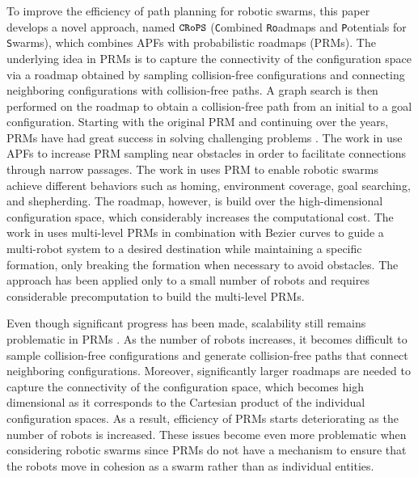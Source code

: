 \documentclass{llncs}
\newcommand{\Acronym}[1]{\ensuremath{{\small{\texttt{#1}}}}}
\newcommand{\Name}{\Acronym{CRoPS}}
\begin{document}
To improve the efficiency of path planning for robotic swarms, this
paper develops a novel approach, named $\Name$ (\texttt{C}ombined
\texttt{Ro}admaps and \texttt{P}otentials for \texttt{S}warms), which combines APFs
with probabilistic roadmaps (PRMs). The underlying idea in PRMs is to
capture the connectivity of the configuration space via a roadmap
obtained by sampling collision-free configurations and connecting
neighboring configurations with collision-free paths. A graph search
is then performed on the roadmap to obtain a collision-free path from
an initial to a goal configuration.  Starting with the original PRM
\cite{PRM} and continuing over the years, PRMs have had great success
in solving challenging problems
\cite{TogglePRM,UOBPRM,PlakuTRO05,HSUBridge,GaussianPRM,manocha12}.
The work in \cite{PRMapf1,PRMapf2} use APFs to increase PRM sampling near
obstacles in order to facilitate connections through narrow passages.
The work in \cite{LienSwarming,LienSwarmingRules,LienShepherding} uses
PRM to enable robotic swarms achieve different
behaviors such as homing, environment coverage, goal searching, and
shepherding. The roadmap, however, is build over the high-dimensional
configuration space, which considerably increases the computational
cost. The work in \cite{KostasSwarm} uses multi-level PRMs in
combination with Bezier curves to guide a multi-robot system to a
desired destination while maintaining a specific formation, only
breaking the formation when necessary to avoid obstacles. The approach
has been applied only to a small number of robots and requires
considerable precomputation to build the multi-level PRMs.


Even though significant progress has been made, scalability still
remains problematic in PRMs \cite{book:MP,book:LaValle}. As the number
of robots increases, it becomes difficult to sample collision-free
configurations and generate collision-free paths that connect
neighboring configurations. Moreover, significantly larger roadmaps
are needed to capture the connectivity of the configuration space,
which becomes high dimensional as it corresponds to the Cartesian
product of the individual configuration spaces.  As a result,
efficiency of PRMs starts deteriorating as the number of robots is
increased. These issues become even more problematic when considering
robotic swarms since PRMs do not have a mechanism to ensure that the
robots move in cohesion as a swarm rather than as individual entities.
\end{document}
